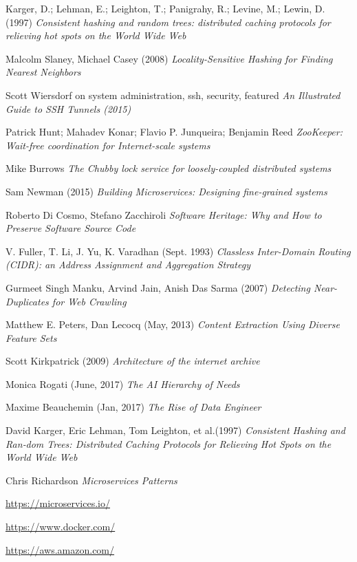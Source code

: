 \begin{thebibliography}{9}
Karger, D.; Lehman, E.; Leighton, T.; Panigrahy, R.; Levine, M.; Lewin, D. (1997)
\textit{Consistent hashing and random trees: distributed caching protocols for relieving hot spots on the World Wide Web}

Malcolm Slaney, Michael Casey (2008)
\textit{Locality-Sensitive Hashing for Finding Nearest Neighbors}

Scott Wiersdorf on system administration, ssh, security, featured
\textit{An Illustrated Guide to SSH Tunnels (2015)}

Patrick Hunt; Mahadev Konar; Flavio P. Junqueira; Benjamin Reed
\textit{ZooKeeper: Wait-free coordination for Internet-scale systems}

Mike Burrows
\textit{The Chubby lock service for loosely-coupled distributed systems}

Sam Newman (2015)
\textit{Building Microservices: Designing fine-grained systems}

Roberto Di Cosmo, Stefano Zacchiroli
\textit{Software Heritage: Why and How to Preserve Software Source Code}

  V. Fuller, T. Li, J. Yu, K. Varadhan (Sept. 1993)
  \textit{Classless Inter-Domain Routing (CIDR): an Address Assignment and Aggregation Strategy}

  Gurmeet Singh Manku, Arvind Jain, Anish Das Sarma (2007)
  \textit{Detecting Near-Duplicates for Web Crawling}

  Matthew E. Peters, Dan Lecocq (May, 2013)
  \textit{Content Extraction Using Diverse Feature Sets}

  Scott Kirkpatrick (2009)
  \textit{Architecture of the internet archive}

  Monica Rogati (June, 2017)
  \textit{The AI Hierarchy of Needs}

  Maxime Beauchemin (Jan, 2017)
  \textit{The Rise of Data Engineer}

  David Karger, Eric Lehman, Tom Leighton, et al.(1997)
  \textit{Consistent Hashing and Ran‐dom Trees: Distributed Caching Protocols for Relieving Hot Spots on the World Wide Web}

  Chris Richardson
  \textit{Microservices Patterns}

\url{https://microservices.io/}

\url{https://www.docker.com/}

\url{https://aws.amazon.com/}

\end{thebibliography}